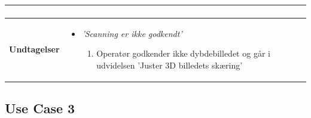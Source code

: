 \begin{longtabu}{ | l | p{0.8\textwidth} | }
{\begin{itemize}
\begin{enumerate}[label=A\arabic*]
  		\end{enumerate}
  	\end{itemize}} \\ \hline
  \textbf{Undtagelser} & 
  	{\begin{itemize} 
  	\item \textit{'Scanning er ikke godkendt'}
  		\begin{enumerate}[label=B\arabic*]
  		\item Operatør godkender ikke dybdebilledet og går i udvidelsen 'Juster 3D billedets skæring'
  		\end{enumerate}
  	\end{itemize}} \\\hline
	\end{longtabu}
\newpage

\subsection{Use Case 3}
